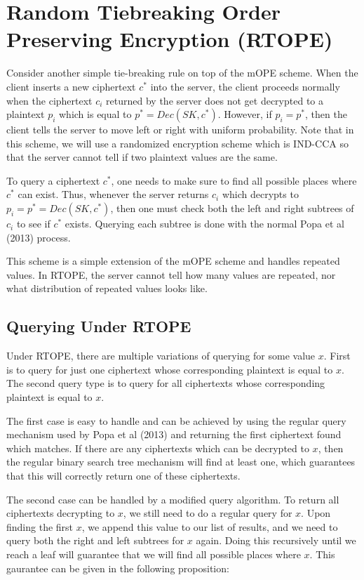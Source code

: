 \documentclass[12pt]{article}
\begin{document}
\section{Random Tiebreaking Order Preserving Encryption (RTOPE)}

Consider another simple tie-breaking rule on top of the mOPE scheme. When the client inserts a new ciphertext $c^*$ into the server, the client proceeds normally when the ciphertext $c_i$ returned by the server does not get decrypted to a plaintext $p_i$ which is equal to $p^* = Dec(SK, c^*)$. However, if $p_i = p^*$, then the client tells the server to move left or right with uniform probability. Note that in this scheme, we will use a randomized encryption scheme which is IND-CCA so that the server cannot tell if two plaintext values are the same.

To query a ciphertext $c^*$, one needs to make sure to find all possible places where $c^*$ can exist. Thus, whenever the server returns $c_i$ which decrypts to $p_i = p^* = Dec(SK, c^*)$, then one must check both the left and right subtrees of $c_i$ to see if $c^*$ exists. Querying each subtree is done with the  normal Popa et al (2013) process.

This scheme is a simple extension of the mOPE scheme and handles repeated values. In RTOPE, the server cannot tell how many values are repeated, nor what distribution of repeated values looks like.

\subsection{Querying Under RTOPE}

Under RTOPE, there are multiple variations of querying for some value $x$. First is to query for just one ciphertext whose corresponding plaintext is equal to $x$. The second query type is to query for all ciphertexts whose corresponding plaintext is equal to $x$.

The first case is easy to handle and can be achieved by using the regular query mechanism used by Popa et al (2013) and returning the first ciphertext found which matches. If there are any ciphertexts which can be decrypted to $x$, then the regular binary search tree mechanism will find at least one, which guarantees that this will correctly return one of these ciphertexts.

The second case can be handled by a modified query algorithm. To return all ciphertexts decrypting to $x$, we still need to do a regular query for $x$. Upon finding the first $x$, we append this value to our list of results, and we need to query both the right and left subtrees for $x$ again. Doing this recursively until we reach a leaf will guarantee that we will find all possible places where $x$. This gaurantee can be given in the following proposition: \\ \\
\end{document}
